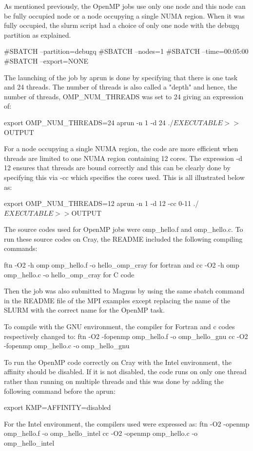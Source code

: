 \documentclass[journal]{IEEEtran}
\begin{document}
As mentioned previously, the OpenMP jobs use only one node and this node can be fully occupied node or a node occupying a single NUMA region. When it was 
fully occupied, the slurm script had a choice of only one node with the debugq partition as explained.

#SBATCH --partition=debugq
#SBATCH --nodes=1
#SBATCH --time=00:05:00
#SBATCH --export=NONE

The launching of the job by aprun is done by specifying that there is one task and 24 threads. The number of threads is also called a "depth" and hence,
the number of threads, OMP_NUM_THREADS was set to 24 giving an expression of:

export OMP_NUM_THREADS=24
aprun -n 1 -d 24 ./$EXECUTABLE >> ${OUTPUT}

For a node occupying a single NUMA region, the code are more efficient when threads are limited to one NUMA region containing 12 cores. The expression 
-d 12 ensures that threads are bound correctly and this can be clearly done by specifying this via -cc which specifies the cores used. This is all 
illustrated below as:

export OMP_NUM_THREADS=12
aprun -n 1 -d 12 -cc 0-11 ./$EXECUTABLE >> ${OUTPUT}

The source codes used for OpenMP jobs were omp_hello.f and omp_hello.c. To run these source codes on Cray, the README included the following compiling 
commands:

ftn -O2 -h omp omp_hello.f -o hello_omp_cray for fortran and
cc -O2 -h omp omp_hello.c -o hello_omp_cray for C code

Then the job was also submitted to Magnus by using the same sbatch command in the README file of the MPI examples except replacing the name of the SLURM
with the correct name for the OpenMP task.

To compile with the GNU environment, the compiler for Fortran and c codes respectively changed to: 
ftn -O2 -fopenmp omp_hello.f -o omp_hello_gnu
cc -O2 -fopenmp omp_hello.c -o omp_hello_gnu

To run the OpenMP code correctly on Cray with the Intel environment, the affinity should be disabled. If it is not disabled, the code runs on only one
thread rather than running on multiple threads and this was done by adding the following command before the aprun:

export KMP=AFFINITY=disabled

For the Intel environment, the compilers used were expressed as:
ftn -O2 -openmp omp_hello.f -o omp_hello_intel
cc -O2 -openmp omp_hello.c -o omp_hello_intel
\end{document}
